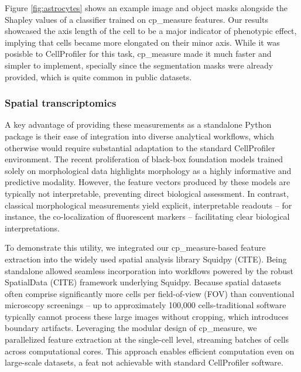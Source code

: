 \documentclass{article}
\begin{document}
Figure \ref{fig:astrocytes} shows an example image and object masks alongside the Shapley values of a classifier trained on cp\_measure features. Our results showcased the axis length of the cell to be a major indicator of phenotypic effect, implying that cells became more elongated on their minor axis. While it was posisble to CellProfiler for this task, cp\_measure made it much faster and simpler to implement, specially since the segmentation masks were already provided, which is quite common in public datasets.
\subsubsection{Spatial transcriptomics}
\label{sec:org5711d86}
A key advantage of providing these measurements as a standalone Python package is their ease of integration into diverse analytical workflows, which otherwise would require substantial adaptation to the standard CellProfiler environment. The recent proliferation of black-box foundation models trained solely on morphological data highlights morphology as a highly informative and predictive modality. However, the feature vectors produced by these models are typically not interpretable, preventing direct biological assessment. In contrast, classical morphological measurements yield explicit, interpretable readouts -- for instance, the co-localization of fluorescent markers -- facilitating clear biological interpretations.

To demonstrate this utility, we integrated our cp\_measure-based feature extraction into the widely used spatial analysis library Squidpy (CITE). Being standalone allowed seamless incorporation into workflows powered by the robust SpatialData (CITE) framework underlying Squidpy. Because spatial datasets often comprise significantly more cells per field-of-view (FOV) than conventional microscopy screenings -- up to approximately 100,000 cells-traditional software typically cannot process these large images without cropping, which introduces boundary artifacts. Leveraging the modular design of cp\_measure, we parallelized feature extraction at the single-cell level, streaming batches of cells across computational cores. This approach enables efficient computation even on large-scale datasets, a feat not achievable with standard CellProfiler software.
\end{document}
